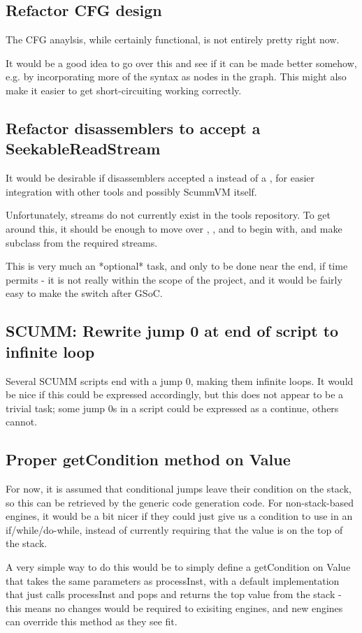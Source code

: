 \subsection{Refactor CFG design}
The CFG anaylsis, while certainly functional, is not entirely pretty right now.

It would be a good idea to go over this and see if it can be made better somehow, e.g. by incorporating more of the syntax as nodes in the graph. This might also make it easier to get short-circuiting working correctly.

\subsection{Refactor disassemblers to accept a SeekableReadStream}
It would be desirable if disassemblers accepted a  instead of a , for easier integration with other tools and possibly ScummVM itself.

Unfortunately, streams do not currently exist in the tools repository. To get around this, it should be enough to move over , , and  to begin with, and make  subclass from the required streams.

This is very much an *optional* task, and only to be done near the end, if time permits - it is not really within the scope of the project, and it would be fairly easy to make the switch after GSoC.

\subsection{SCUMM: Rewrite jump 0 at end of script to infinite loop}
Several SCUMM scripts end with a jump 0, making them infinite loops. It would be nice if this could be expressed accordingly, but this does not appear to be a trivial task; some jump 0s in a script could be expressed as a continue, others cannot.

\subsection{Proper getCondition method on Value}
For now, it is assumed that conditional jumps leave their condition on the stack, so this can be retrieved by the generic code generation code. For non-stack-based engines, it would be a bit nicer if they could just give us a condition to use in an if/while/do-while, instead of currently requiring that the value is on the top of the stack.

A very simple way to do this would be to simply define a getCondition on Value that takes the same parameters as processInst, with a default implementation that just calls processInst and pops and returns the top value from the stack - this means no changes would be required to exisiting engines, and new engines can override this method as they see fit.
